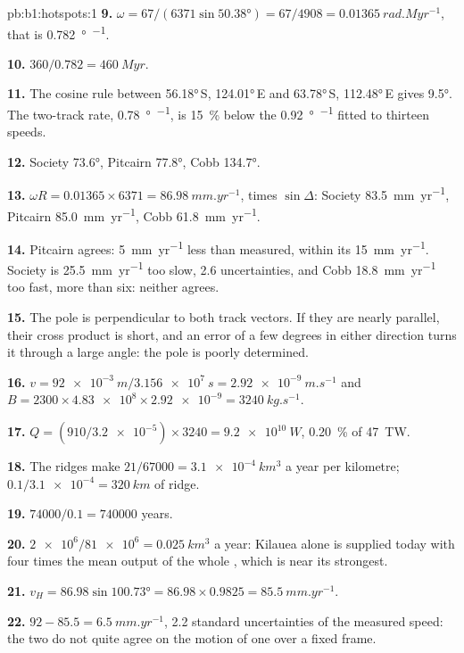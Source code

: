 \begin{solution}{pb:b1:hotspots:1}
\textbf{9.} $\omega = 67/(6371\sin\ang{50.38}) = 67/4908 =
\qty{0.01365}{rad.Myr^{-1}}$, that is \qty{0.782}{\degree\per\Myr}.

\textbf{10.} $360/0.782 = \qty{460}{Myr}$.

\textbf{11.} The cosine rule between \ang{56.18}\,S, \ang{124.01}\,E and
\ang{63.78}\,S, \ang{112.48}\,E gives \ang{9.5}. The two-track rate,
\qty{0.78}{\degree\per\Myr}, is \qty{15}{\percent} below the
\qty{0.92}{\degree\per\Myr} fitted to thirteen speeds.

\textbf{12.} Society \ang{73.6}, Pitcairn \ang{77.8}, Cobb \ang{134.7}.

\textbf{13.} $\omega R = 0.01365\times6371 = \qty{86.98}{mm.yr^{-1}}$, times
$\sin\Delta$: Society \qty{83.5}{mm.yr^{-1}}, Pitcairn
\qty{85.0}{mm.yr^{-1}}, Cobb \qty{61.8}{mm.yr^{-1}}.

\textbf{14.} Pitcairn agrees: \qty{5}{mm.yr^{-1}} less than measured, within
its \qty{15}{mm.yr^{-1}}. Society is \qty{25.5}{mm.yr^{-1}} too slow, 2.6
uncertainties, and Cobb \qty{18.8}{mm.yr^{-1}} too fast, more than six:
neither agrees.

\textbf{15.} The pole is perpendicular to both track vectors. If they are
nearly parallel, their cross product is short, and an error of a few degrees in
either direction turns it through a large angle: the pole is poorly
determined.

\textbf{16.} $v = \qty{92e-3}{m}/\qty{3.156e7}{s} = \qty{2.92e-9}{m.s^{-1}}$
and $B = 2300\times\num{4.83e8}\times\num{2.92e-9} = \qty{3240}{kg.s^{-1}}$.

\textbf{17.} $Q = (910/\num{3.2e-5})\times3240 = \qty{9.2e10}{W}$,
\qty{0.20}{\percent} of \qty{47}{TW}.

\textbf{18.} The ridges make $21/67000 = \qty{3.1e-4}{km^3}$ a year per
kilometre; $0.1/\num{3.1e-4} = \qty{320}{km}$ of ridge.

\textbf{19.} $74000/0.1 = \num{740000}$ years.

\textbf{20.} $\num{2e6}/\num{81e6} = \qty{0.025}{km^3}$ a year: Kilauea alone
is supplied today with four times the mean output of the whole , which
is near its strongest.

\textbf{21.} $v_H = 86.98\sin\ang{100.73} = 86.98\times0.9825 =
\qty{85.5}{mm.yr^{-1}}$.

\textbf{22.} $92 - 85.5 = \qty{6.5}{mm.yr^{-1}}$, 2.2 standard uncertainties of
the measured speed: the two  do not quite agree on the motion of one
 over a fixed frame.


\end{solution}
